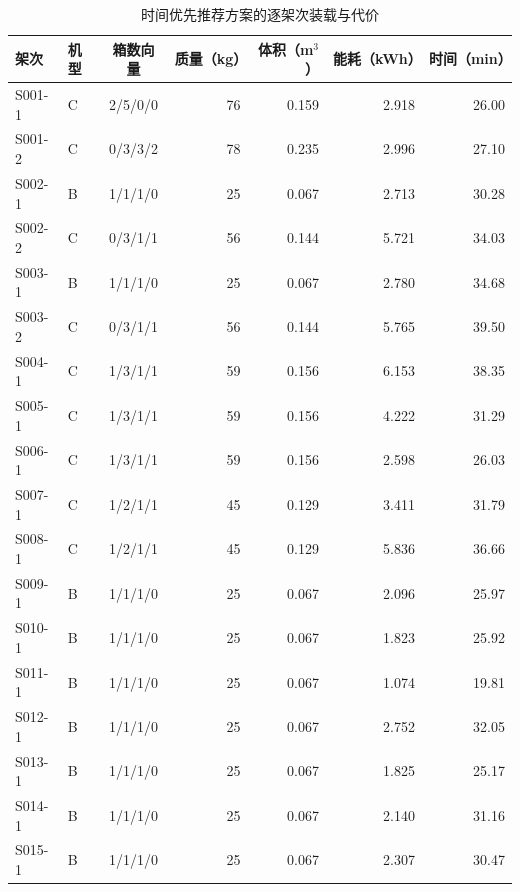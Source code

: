 \begin{table}[!htbp]
\centering
\caption{时间优先推荐方案的逐架次装载与代价}
\label{tab:q1-plan}
\small
\setlength{\tabcolsep}{4pt}
\renewcommand{\arraystretch}{1.10}
\begin{tabular}{@{}llcrrrr@{}}
\toprule
架次 & 机型 & 箱数向量 & 质量（kg） & 体积（m$^3$） & 能耗（kWh） & 时间（min） \\
\midrule
S001-1 & C & 2/5/0/0 & 76 & 0.159 & 2.918 & 26.00 \\
S001-2 & C & 0/3/3/2 & 78 & 0.235 & 2.996 & 27.10 \\
S002-1 & B & 1/1/1/0 & 25 & 0.067 & 2.713 & 30.28 \\
S002-2 & C & 0/3/1/1 & 56 & 0.144 & 5.721 & 34.03 \\
S003-1 & B & 1/1/1/0 & 25 & 0.067 & 2.780 & 34.68 \\
S003-2 & C & 0/3/1/1 & 56 & 0.144 & 5.765 & 39.50 \\
S004-1 & C & 1/3/1/1 & 59 & 0.156 & 6.153 & 38.35 \\
S005-1 & C & 1/3/1/1 & 59 & 0.156 & 4.222 & 31.29 \\
S006-1 & C & 1/3/1/1 & 59 & 0.156 & 2.598 & 26.03 \\
S007-1 & C & 1/2/1/1 & 45 & 0.129 & 3.411 & 31.79 \\
S008-1 & C & 1/2/1/1 & 45 & 0.129 & 5.836 & 36.66 \\
S009-1 & B & 1/1/1/0 & 25 & 0.067 & 2.096 & 25.97 \\
S010-1 & B & 1/1/1/0 & 25 & 0.067 & 1.823 & 25.92 \\
S011-1 & B & 1/1/1/0 & 25 & 0.067 & 1.074 & 19.81 \\
S012-1 & B & 1/1/1/0 & 25 & 0.067 & 2.752 & 32.05 \\
S013-1 & B & 1/1/1/0 & 25 & 0.067 & 1.825 & 25.17 \\
S014-1 & B & 1/1/1/0 & 25 & 0.067 & 2.140 & 31.16 \\
S015-1 & B & 1/1/1/0 & 25 & 0.067 & 2.307 & 30.47 \\
\bottomrule
\end{tabular}
\par{}
\end{table}
